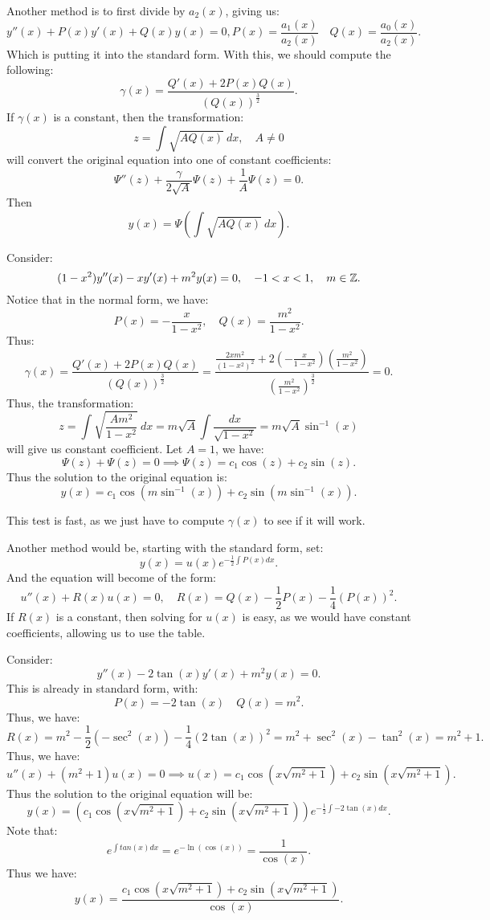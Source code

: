 \documentclass[../main/main.tex]{subfiles}
\begin{document}
Another method is to first divide by $a_2(x)$, giving us: \[
	y''(x) + P(x) y'(x) + Q(x) y(x) = 0, P(x) = \frac{a_1(x)}{a_2(x)}\quad Q(x) = \frac{a_0(x)}{a_2(x)}
.\] Which is putting it into the standard form. With this, we should compute the following: \[
\gamma(x) = \frac{Q'(x) + 2P(x)Q(x)}{(Q(x))^{\frac{3}{2}}}
.\] If $\gamma(x)$ is a constant, then the transformation: \[
z=\int\sqrt{AQ(x)} ~dx, \quad A \neq 0
\] will convert the original equation into one of constant coefficients: \[
\Psi''(z)+ \frac{\gamma}{2\sqrt{A} }\Psi(z) + \frac{1}{A}\Psi(z) = 0
.\] Then \[
y(x)= \Psi\left( \int\sqrt{AQ(x)} ~dx \right) 
.\] 
\begin{example}
	Consider: \[
		(1-x^2)y''(x) - xy'(x) + m^2y(x) = 0, \quad-1<x<1, \quad m \in  \mathbb{Z}
	.\] Notice that in the normal form, we have: \[
	P(x) = -\frac{x}{1-x^2},\quad Q(x) = \frac{m^2}{1-x^2}
	.\] Thus: \[
	\gamma(x) = \frac{Q'(x) + 2P(x) Q(x)}{ (Q(x))^{\frac{3}{2}}} = \frac{\frac{2xm^2}{(1-x^2)^2}+2\left( -\frac{x}{1-x^2} \right) \left( \frac{m^2}{1-x^2} \right) }{\left( \frac{m^2}{1-x^2} \right) ^{\frac{3}{2}}}=0
	.\] Thus, the transformation: \[
	z=\int \sqrt{\frac{Am^2}{1-x^2}} ~dx = m\sqrt{A} \int \frac{dx}{\sqrt{1-x^2} }=m\sqrt{A} \sin^{-1}(x)
	\] will give us constant coefficient. Let $A=1$, we have: \[
	\Psi(z) + \Psi(z) = 0 \implies \Psi(z) = c_1\cos(z) +c_2 \sin(z)
	.\] Thus the solution to the original equation is: \[
	y(x) = c_1 \cos(m\sin^{-1}(x))+c_2\sin(m\sin^{-1}(x))
	.\] 
	\end{example}
	\begin{remark}
		This test is fast, as we just have to compute $\gamma(x)$ to see if it will work.
	\end{remark}
Another method would be, starting with the standard form, set: \[
	y(x) = u(x) e^{-\frac{1}{2}\int P(x)dx}
.\] And the equation will become of the form: \[
u''(x) + R(x) u(x) = 0, \quad R(x) = Q(x) -\frac{1}{2}P(x) - \frac{1}{4}(P(x))^2
.\] If $R(x)$ is a constant, then solving for $u(x)$ is easy, as we would have constant coefficients, allowing us to use the table.
\begin{example}
	Consider: \[
		y''(x) - 2\tan(x) y'(x) + m^2y(x) = 0
	.\] This is already in standard form, with:  \[
	P(x) = -2\tan (x) \quad Q(x) = m^2
	.\] Thus, we have: \[
	R(x) = m^2-\frac{1}{2}\left( -\sec^2(x) \right) -\frac{1}{4}(2\tan(x))^2= m^2+\sec^2(x)-\tan^2(x) = m^2+1
	.\] Thus, we have: \[
	u''(x) + (m^2+1) u(x) = 0 \implies u(x) = c_1\cos\left(x\sqrt{m^2+1} \right) + c_2\sin\left(x\sqrt{m^2+1} \right)
	.\] Thus the solution to the original equation will be: \[
	y(x) = \left( c_1 \cos\left( x\sqrt{m^2+1}  \right) +c_2\sin\left( x\sqrt{m^2+1}  \right)  \right) e^{-\frac{1}{2}\int-2\tan(x) dx}
	.\] Note that: \[
	e^{\int tan(x) dx} = e^{-\ln(\cos(x))} = \frac{1}{\cos(x)}
.\] Thus we have: \[
y(x) = \frac{c_1 \cos\left( x\sqrt{m^2+1}  \right) +c_2\sin\left( x\sqrt{m^2+1}  \right) }{\cos(x)}
.\] 
\end{example}
\end{document}
